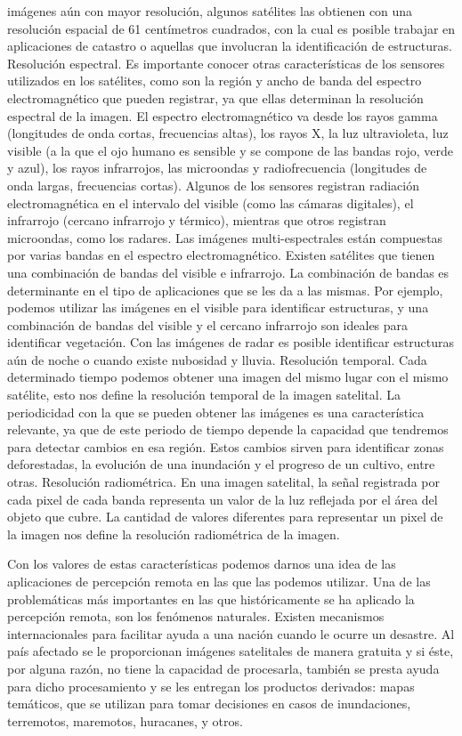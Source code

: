 \documentclass[12pt]{book}
\theoremstyle{definition}
\theoremstyle{remark}
\theoremstyle{plain}
\begin{document}
imágenes aún con mayor resolución, algunos
satélites las obtienen con una resolución espacial de
61 centímetros cuadrados, con la cual es posible
trabajar en aplicaciones de catastro o aquellas que
involucran la identificación de estructuras.
Resolución espectral. Es importante conocer otras
características de los sensores utilizados en los
satélites, como son la región y ancho de banda del
espectro electromagnético que pueden registrar, ya que ellas determinan la resolución espectral de la
imagen. El espectro electromagnético va desde los
rayos gamma (longitudes de onda cortas, frecuencias
altas), los rayos X, la luz ultravioleta, luz visible (a la
que el ojo humano es sensible y se compone de las
bandas rojo, verde y azul), los rayos infrarrojos, las
microondas y radiofrecuencia (longitudes de onda
largas, frecuencias cortas). Algunos de los sensores
registran radiación electromagnética en el intervalo
del visible (como las cámaras digitales), el infrarrojo
(cercano infrarrojo y térmico), mientras que otros
registran microondas, como los radares.
Las imágenes multi-espectrales están compuestas
por varias bandas en el espectro electromagnético.
Existen satélites que tienen una combinación de
bandas del visible e infrarrojo. La combinación de
bandas es determinante en el tipo de aplicaciones
que se les da a las mismas. Por ejemplo, podemos
utilizar las imágenes en el visible para identificar
estructuras, y una combinación de bandas del visible
y el cercano infrarrojo son ideales para identificar
vegetación. Con las imágenes de radar es posible
identificar estructuras aún de noche o cuando existe
nubosidad y lluvia.
Resolución temporal. Cada determinado tiempo
podemos obtener una imagen del mismo lugar con el
mismo satélite, esto nos define la resolución temporal
de la imagen satelital. La periodicidad con la que se
pueden obtener las imágenes es una característica
relevante, ya que de este periodo de tiempo depende
la capacidad que tendremos para detectar cambios
en esa región. Estos cambios sirven para identificar
zonas deforestadas, la evolución de una inundación y
el progreso de un cultivo, entre otras.
Resolución radiométrica. En una imagen satelital, la
señal registrada por cada pixel de cada banda
representa un valor de la luz reflejada por el área del
objeto que cubre. La cantidad de valores diferentes
para representar un pixel de la imagen nos define la
resolución radiométrica de la imagen.

Con los valores de estas características podemos
darnos una idea de las aplicaciones de percepción
remota en las que las podemos utilizar. Una de las
problemáticas más importantes en las que
históricamente se ha aplicado la percepción remota,
son los fenómenos naturales. Existen mecanismos
internacionales para facilitar ayuda a una nación
cuando le ocurre un desastre. Al país afectado se le
proporcionan imágenes satelitales de manera gratuita
y si éste, por alguna razón, no tiene la capacidad de
procesarla, también se presta ayuda para dicho
procesamiento y se les entregan los productos
derivados: mapas temáticos, que se utilizan para
tomar decisiones en casos de inundaciones,
terremotos, maremotos, huracanes, y otros.
\end{document}
